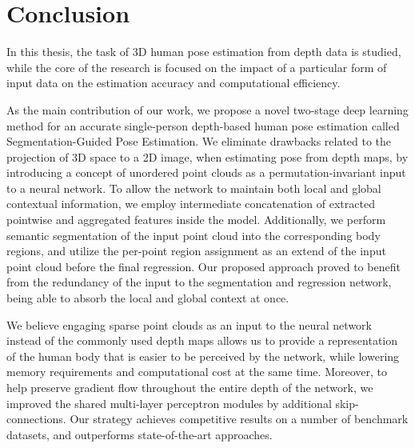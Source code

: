 \chapter{Conclusion}\label{chap:conclusion}
In this thesis, the task of 3D human pose estimation from depth data is studied, while the core of the research is focused on the impact of a particular form of input data on the estimation accuracy and computational efficiency.\par
\vspace{5mm}
\noindent
As the main contribution of our work, we propose a novel two-stage deep learning method for an accurate single-person depth-based human pose estimation called Segmentation-Guided Pose Estimation. We eliminate drawbacks related to the projection of 3D space to a 2D image, when estimating pose from depth maps, by introducing a concept of unordered point clouds as a permutation-invariant input to a neural network. To allow the network to maintain both local and global contextual information, we employ intermediate concatenation of extracted pointwise and aggregated features inside the model. Additionally, we perform semantic segmentation of the input point cloud into the corresponding body regions, and utilize the per-point region assignment as an extend of the input point cloud before the final regression. Our proposed approach proved to benefit from the redundancy of the input to the segmentation and regression network, being able to absorb the local and global context at once.\par
\vspace{5mm}
\noindent
We believe engaging sparse point clouds as an input to the neural network instead of the commonly used depth maps allows us to provide a representation of the human body that is easier to be perceived by the network, while lowering memory requirements and computational cost at the same time. Moreover, to help preserve gradient flow throughout the entire depth of the network, we improved the shared multi-layer perceptron modules by additional skip-connections. Our strategy achieves competitive results on a number of benchmark datasets, and outperforms state-of-the-art approaches.\par
\vspace{5mm}
